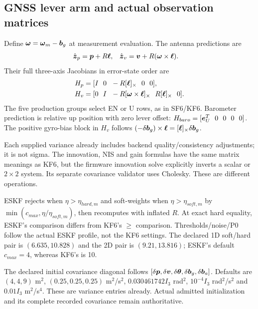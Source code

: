 \subsection{GNSS lever arm and actual observation matrices}
Define $\boldsymbol{\omega}=\boldsymbol{\omega}_m-\boldsymbol{b}_g$ at measurement evaluation. The antenna predictions are
\begin{align}
\hat{\boldsymbol{z}}_p&=\boldsymbol{p}+R\boldsymbol{\ell},&
\hat{\boldsymbol{z}}_v&=\boldsymbol{v}+R(\boldsymbol{\omega}\times\boldsymbol{\ell}).
\label{eq:lever}
\end{align}
Their full three-axis Jacobians in error-state order are
\begin{align}
H_p&=[I\ \ 0\ \ -R\crossmat{\mat\ell}\ \ 0\ \ 0],\\
H_v&=[0\ \ I\ \ -R\crossmat{\mat\omega\times\mat\ell}\ \ R\crossmat{\mat\ell}\ \ 0].
\label{eq:eskf-h}
\end{align}
The five production groups select EN or U rows, as in SF6/KF6. Barometer prediction is relative up position with zero lever offset:
$H_{baro}=[\mat e_U^T\ \ 0\ \ 0\ \ 0\ \ 0]$.
The positive gyro-bias block in $H_v$ follows
$(-\delta\boldsymbol{b}_g)\times\boldsymbol{\ell}=[\boldsymbol{\ell}]_{\times}\delta\boldsymbol{b}_g$.

Each supplied variance already includes backend quality/consistency adjustments; it is not sigma. The innovation, NIS and gain formulas have the same matrix meanings as KF6, but the firmware innovation solve explicitly inverts a scalar or $2\times2$ system. Its separate covariance validator uses Cholesky. These are different operations.

ESKF rejects when $\eta>\eta_{hard,m}$ and soft-weights when $\eta>\eta_{soft,m}$ by $\min(c_{max},\eta/\eta_{soft,m})$, then recomputes with inflated $R$. At exact hard equality, ESKF's comparison differs from KF6's $\ge$ comparison. Thresholds/noise/P0 follow the actual ESKF profile, not the KF6 settings. The declared 1D soft/hard pair is $(6.635,10.828)$ and the 2D pair is $(9.21,13.816)$; ESKF's default $c_{max}=4$, whereas KF6's is 10.

The declared initial covariance diagonal follows $[\delta\boldsymbol{p},\delta\boldsymbol{v},\delta\boldsymbol{\theta},\delta\boldsymbol{b}_g,\delta\boldsymbol{b}_a]$. Defaults are $(4,4,9)$ m$^2$, $(0.25,0.25,0.25)$ m$^2$/s$^2$, $0.030461742 I_3$ rad$^2$, $10^{-4}I_3$ rad$^2$/s$^2$ and $0.01 I_3$ m$^2$/s$^4$. These are variance entries already. Actual admitted initialization and its complete recorded covariance remain authoritative.


